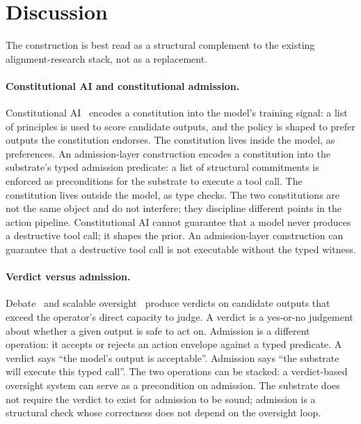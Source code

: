 \section{Discussion}
\label{sec:discussion}

The construction is best read as a structural complement to the existing alignment-research stack, not as a replacement.

\paragraph{Constitutional AI and constitutional admission.}
Constitutional AI~\cite{baiConstitutionalAI2022} encodes a constitution into the model's training signal: a list of principles is used to score candidate outputs, and the policy is shaped to prefer outputs the constitution endorses. The constitution lives inside the model, as preferences. An admission-layer construction encodes a constitution into the substrate's typed admission predicate: a list of structural commitments is enforced as preconditions for the substrate to execute a tool call. The constitution lives outside the model, as type checks. The two constitutions are not the same object and do not interfere; they discipline different points in the action pipeline. Constitutional AI cannot guarantee that a model never produces a destructive tool call; it shapes the prior. An admission-layer construction can guarantee that a destructive tool call is not executable without the typed witness.

\paragraph{Verdict versus admission.}
Debate~\cite{christianoDebate2018} and scalable oversight~\cite{leikeScalableOversight2018,bowmanScalableOversight2022} produce verdicts on candidate outputs that exceed the operator's direct capacity to judge. A verdict is a yes-or-no judgement about whether a given output is safe to act on. Admission is a different operation: it accepts or rejects an action envelope against a typed predicate. A verdict says ``the model's output is acceptable''. Admission says ``the substrate will execute this typed call''. The two operations can be stacked: a verdict-based oversight system can serve as a precondition on admission. The substrate does not require the verdict to exist for admission to be sound; admission is a structural check whose correctness does not depend on the oversight loop.

